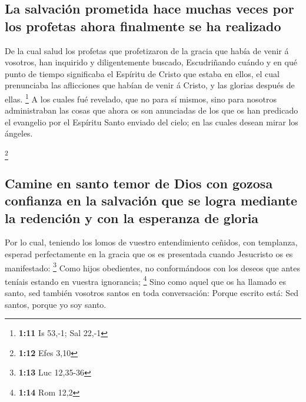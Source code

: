 \hypertarget{la-salvaciuxf3n-prometida-hace-muchas-veces-por-los-profetas-ahora-finalmente-se-ha-realizado}{%
\subsection{La salvación prometida hace muchas veces por los profetas
ahora finalmente se ha
realizado}\label{la-salvaciuxf3n-prometida-hace-muchas-veces-por-los-profetas-ahora-finalmente-se-ha-realizado}}

 De la cual salud los profetas que profetizaron de la
gracia que había de venir á vosotros, han inquirido y diligentemente
buscado,  Escudriñando cuándo y en qué punto de tiempo
significaba el Espíritu de Cristo que estaba en ellos, el cual
prenunciaba las aflicciones que habían de venir á Cristo, y las glorias
después de ellas. \footnote{\textbf{1:11} Is 53,-1; Sal 22,-1}
 A los cuales fué revelado, que no para sí mismos, sino
para nosotros administraban las cosas que ahora os son anunciadas de los
que os han predicado el evangelio por el Espíritu Santo enviado del
cielo; en las cuales desean mirar los ángeles.

\footnote{\textbf{1:12} Efes 3,10}

\hypertarget{camine-en-santo-temor-de-dios-con-gozosa-confianza-en-la-salvaciuxf3n-que-se-logra-mediante-la-redenciuxf3n-y-con-la-esperanza-de-gloria}{%
\subsection{Camine en santo temor de Dios con gozosa confianza en la
salvación que se logra mediante la redención y con la esperanza de
gloria}\label{camine-en-santo-temor-de-dios-con-gozosa-confianza-en-la-salvaciuxf3n-que-se-logra-mediante-la-redenciuxf3n-y-con-la-esperanza-de-gloria}}

 Por lo cual, teniendo los lomos de vuestro entendimiento
ceñidos, con templanza, esperad perfectamente en la gracia que os es
presentada cuando Jesucristo os es manifestado: \footnote{\textbf{1:13}
  Luc 12,35-36}  Como hijos obedientes, no conformándoos
con los deseos que antes teníais estando en vuestra ignorancia;
\footnote{\textbf{1:14} Rom 12,2}  Sino como aquel que os
ha llamado es santo, sed también vosotros santos en toda conversación:
 Porque escrito está: Sed santos, porque yo soy santo.


